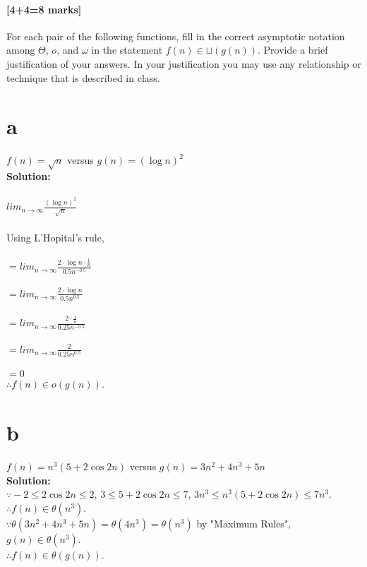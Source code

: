 \documentclass[12pt]{article}
\begin{document}
\subsection{[4+4=8 marks]} 
For each pair of the following functions, fill in the correct asymptotic
notation among $\Theta$, $o$, and $\omega$ in the statement $f(n)\in
\sqcup(g(n))$.  Provide a brief justification of your answers.  In your
justification you may use any relationship or technique that is described
in class.
\begin{itemize}
\part{a} $f(n)=\sqrt{n}$ versus $g(n)=(\log{n})^{2}$
\\\textbf{Solution: }
\\
\\$lim_{n \rightarrow \infty} \frac{(\log n)^2} {\sqrt n}$
\\
\\Using L'Hopital's rule,
\\
\\$=lim_{n \rightarrow \infty} \frac{2 \cdot \log n \cdot \frac {1} {n}} {0.5n^{-0.5}}$
\\
\\$=lim_{n \rightarrow \infty} \frac{2 \cdot \log n} {0.5n^{0.5}}$
\\
\\$=lim_{n \rightarrow \infty} \frac{2 \cdot \frac {1} {n}} {0.25n^{-0.5}}$
\\
\\$=lim_{n \rightarrow \infty} \frac{2} {0.25n^{0.5}}$
\\
\\$= 0$
\\$\therefore f(n) \in o(g(n))$.
\part{b} $f(n)=n^3(5+2\cos{2n})$ versus $g(n)=3n^2+4n^3+5n$
\\\textbf{Solution: }
\\$\because -2 \leq 2\cos{2n} \leq 2$, $3 \leq 5+2\cos{2n} \leq 7$, $3n^3 \leq n^3(5+2\cos{2n}) \leq 7n^3$.
\\$\therefore f(n) \in \theta (n^3)$.
\\$\because \theta (3n^2+4n^3+5n) = \theta(4n^3) = \theta(n^3)$ by "Maximum Rules", $g(n) \in \theta (n^3)$.
\\$\therefore f(n) \in \theta (g(n))$.
\end{itemize}
\end{document}
